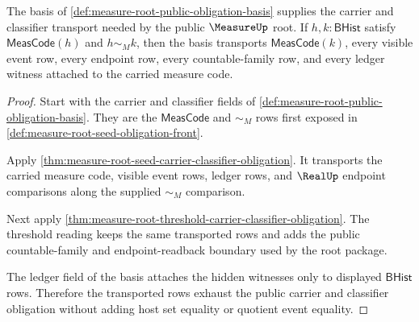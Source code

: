 \begin{theorem}
\label{thm:measure-root-public-obligation-basis-carrier}
The basis of \autoref{def:measure-root-public-obligation-basis} supplies the
carrier and classifier transport needed by the public $\MeasureUp$ root. If
$h,k:\mathsf{BHist}$ satisfy $\mathsf{MeasCode}(h)$ and $h\sim_M k$, then the
basis transports $\mathsf{MeasCode}(k)$, every visible event row, every
endpoint row, every countable-family row, and every ledger witness attached
to the carried measure code.
\end{theorem}
\begin{proof}
Start with the carrier and classifier fields of
\autoref{def:measure-root-public-obligation-basis}. They are the
$\mathsf{MeasCode}$ and $\sim_M$ rows first exposed in
\autoref{def:measure-root-seed-obligation-front}.

Apply \autoref{thm:measure-root-seed-carrier-classifier-obligation}. It
transports the carried measure code, visible event rows, ledger rows, and
$\RealUp$ endpoint comparisons along the supplied $\sim_M$ comparison.

Next apply \autoref{thm:measure-root-threshold-carrier-classifier-obligation}.
The threshold reading keeps the same transported rows and adds the public
countable-family and endpoint-readback boundary used by the root package.

The ledger field of the basis attaches the hidden witnesses only to displayed
$\mathsf{BHist}$ rows. Therefore the transported rows exhaust the public
carrier and classifier obligation without adding host set equality or
quotient event equality.
\end{proof}

